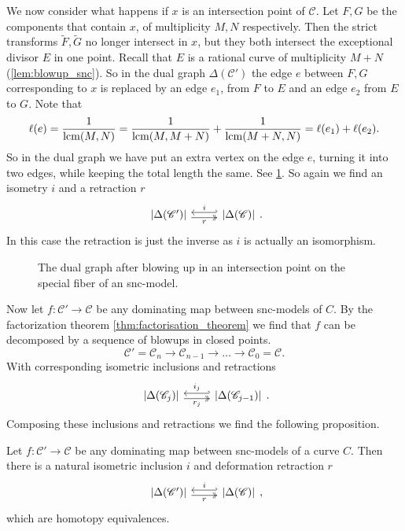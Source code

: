 \medskip

We now consider what happens if $x$ is an intersection point of $\mathscr C$. 
Let $F, G$ be the components that contain $x$, of multiplicity $M, N$ respectively. 
Then the strict transforms $\tilde F, \tilde G$ no longer intersect in $x$, but they both intersect the exceptional divisor $E$ in one point. 
Recall that $E$ is a rational curve of multiplicity $M + N$ (\cref{lem:blowup_snc}). 
So in the dual graph $\Delta(\mathscr C')$ the edge $e$ between $F, G$ corresponding to $x$ is replaced by an edge $e_1$, from $F$ to $E$ and an edge $e_2$ from $E$ to $G$. 
Note that \[
	\ell(e) = \frac{1}{\operatorname{lcm}(M, N)} = \frac{1}{\operatorname{lcm}(M, M + N)} + \frac{1}{\operatorname{lcm}(M+ N, N)} = \ell(e_1) + \ell(e_2)
.\]  
So in the dual graph we have put an extra vertex on the edge $e$, turning it into two edges, while keeping the total length the same.
See \cref{fig:blowup_intersection_points_skeleton}. 
So again we find an isometry $i$ and a retraction $r$
\[
\begin{tikzcd}
	{|\Delta(\mathscr C')|} \rar[hookleftarrow, shift left]{i} \rar[twoheadrightarrow, shift right, ']{r} & {|\Delta(\mathscr C)|} 
\end{tikzcd}
.\] 
In this case the retraction is just the inverse as $i$ is actually an isomorphism. 

\begin{figure}[ht]
    \centering
    \caption{The dual graph after blowing up in an intersection point on the special fiber of an snc-model. }
    \label{fig:blowup_intersection_points_skeleton}
\end{figure}

Now let $f:\mathscr C' \to \mathscr C$ be any dominating map between snc-models of $C$. 
By the factorization theorem \cref{thm:factorisation_theorem} we find that $f$ can be decomposed by a sequence of blowups in closed points. 
\[
\mathscr C' = \mathscr C_n \to \mathscr C_{n-1} \to \ldots \to \mathscr C_0 = \mathscr C
.\] 
With corresponding isometric inclusions and retractions 
\[
\begin{tikzcd}
	{|\Delta(\mathscr C_{j})|} \rar[hookleftarrow, shift left]{i_j} \rar[twoheadrightarrow, shift right, ']{r_j} & {|\Delta(\mathscr C_{j-1})|} 
\end{tikzcd}
.\] 
Composing these inclusions and retractions we find the following proposition.
\begin{proposition}\label{prop:inclusion_retraction_dual_graph}
	Let $f:\mathscr C' \to \mathscr C$ be any dominating map between snc-models of a curve $C$. 
	Then there is a natural isometric inclusion $i$ and deformation retraction $r$
\[
\begin{tikzcd}
	{|\Delta(\mathscr C')|} \rar[hookleftarrow, shift left]{i} \rar[twoheadrightarrow, shift right, ']{r} & {|\Delta(\mathscr C)|} 
\end{tikzcd}
,\] 
	which are homotopy equivalences.
\end{proposition}

